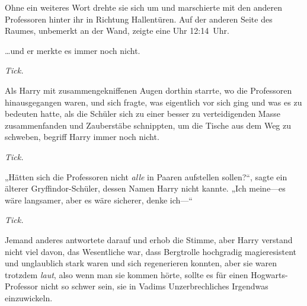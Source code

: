 
Ohne ein weiteres Wort drehte sie sich um und marschierte mit den anderen Professoren hinter ihr in Richtung Hallentüren. Auf der anderen Seite des Raumes, unbemerkt an der Wand, zeigte eine Uhr 12:14~Uhr.

\later

…und er merkte es immer noch nicht.

\emph{Tick.}

Als Harry mit zusammengekniffenen Augen dorthin starrte, wo die Professoren hinausgegangen waren, und sich fragte, was eigentlich vor sich ging und was es zu bedeuten hatte, als die Schüler sich zu einer besser zu verteidigenden Masse zusammenfanden und Zauberstäbe schnippten, um die Tische aus dem Weg zu schweben, begriff Harry immer noch nicht.

\emph{Tick.}

„Hätten sich die Professoren nicht \emph{alle} in Paaren aufstellen sollen?“, sagte ein älterer Gryffindor-Schüler, dessen Namen Harry nicht kannte.
„Ich meine—es wäre langsamer, aber es wäre sicherer, denke ich—“

\emph{Tick.}

Jemand anderes antwortete darauf und erhob die Stimme, aber Harry verstand nicht viel davon, das Wesentliche war, dass Bergtrolle hochgradig magieresistent und unglaublich stark waren und sich regenerieren konnten, aber sie waren trotzdem \emph{laut}, also wenn man sie kommen hörte, sollte es für einen Hogwarts-Professor nicht so schwer sein, sie in Vadims Unzerbrechliches Irgendwas einzuwickeln.


